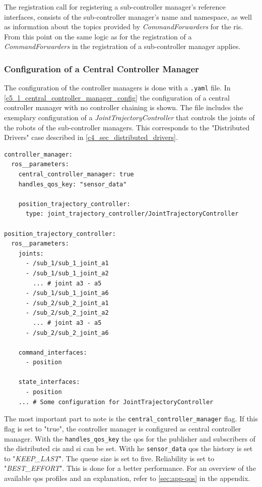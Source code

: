 The registration call for registering a sub-controller manager's reference interfaces, consists of the sub-controller manager's name and namespace, as well as information about the topics provided by \textit{CommandForwarders} for the \glspl{ri}. From this point on the same logic as for the registration of a \textit{CommandForwarders} in the registration of a sub-controller manager applies.

\subsubsection{Configuration of a Central Controller Manager}\label{c5_sec_central_controller_manager_conf}
The configuration of the controller managers is done with a \texttt{.yaml} file. In \autoref{c5_l_central_controller_manager_config} the configuration of a central controller manager with no controller chaining is shown. The file includes the exemplary configuration of a \textit{JointTrajectoryController} that controls the joints of the robots of the sub-controller managers. This corresponds to the "Distributed Drivers" case described in \autoref{c4_sec_distributed_drivers}. 
\lstset{language=yaml,basicstyle=\small}
\begin{lstlisting}[caption=Example configuration of a central controller manager with a joint trajecotry controller.,label=c5_l_central_controller_manager_config]
controller_manager:
  ros__parameters:
    central_controller_manager: true
    handles_qos_key: "sensor_data"
    
    position_trajectory_controller:
      type: joint_trajectory_controller/JointTrajectoryController

position_trajectory_controller:
  ros__parameters:
    joints:
      - /sub_1/sub_1_joint_a1
      - /sub_1/sub_1_joint_a2
        ... # joint a3 - a5
      - /sub_1/sub_1_joint_a6
      - /sub_2/sub_2_joint_a1
      - /sub_2/sub_2_joint_a2
        ... # joint a3 - a5
      - /sub_2/sub_2_joint_a6

    command_interfaces:
      - position

    state_interfaces:
      - position
    ... # Some configuration for JointTrajectoryController 
\end{lstlisting}
The most important part to note is the \lstset{language=yaml,basicstyle=\small\ttfamily, breaklines=true}\lstinline{central_controller_manager} flag. If this flag is set to "true", the controller manager is configured as central controller manager. With the \texttt{handles\_qos\_key} the \gls{qos} for the publisher and subscribers of the distributed \glspl{ci} and \gls{si} can be set. With he \lstset{language=yaml,basicstyle=\small\ttfamily, breaklines=true}\lstinline{sensor_data} \gls{qos} the history is set to "\textit{KEEP\_LAST}". The queue size is set to five. Reliability is set to "\textit{BEST\_EFFORT}". This is done for a better performance. For an overview of the available \gls{qos} profiles and an explanation, refer to \autoref{sec:app-qos} in the appendix.\newline
